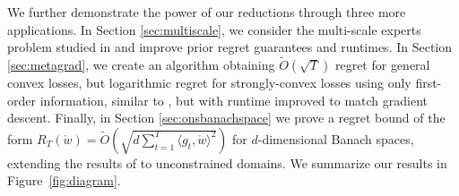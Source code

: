 \documentclass[12pt]{colt2018} %
\newcommand{\w}{\mathring{w}}
\begin{document}
We further demonstrate the power of our reductions through three more applications. In Section \ref{sec:multiscale}, we consider the multi-scale experts problem studied in \citep{foster2017parameter, bubeck2017online} and improve prior regret guarantees and runtimes. In Section \ref{sec:metagrad}, we create an algorithm obtaining $\tilde O(\sqrt{T})$ regret for general convex losses, but logarithmic regret for strongly-convex losses using only first-order information, similar to \citep{vanervan2016metagrad,cutkosky2017stochastic}, but with runtime improved to match gradient descent. Finally, in Section \ref{sec:onsbanachspace} we prove a regret bound of the form $R_T(\w)=\tilde{O}\left(\sqrt{d \sum_{t=1}^T \langle g_t, \w \rangle^2}\right)$ for $d$-dimensional Banach spaces, extending the results of \cite{NIPS2017_7060} to unconstrained domains. We summarize our results in Figure~\ref{fig:diagram}.
\end{document}
